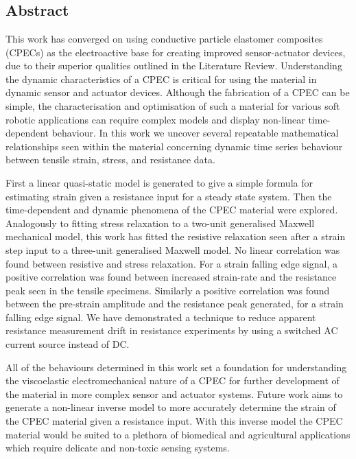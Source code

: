 \chapter{\chapiiiname}
\label{chapter3}



\section*{Abstract}
This work has converged on using conductive particle elastomer composites (CPECs) as the electroactive base for creating improved sensor-actuator devices, due to their superior qualities outlined in the Literature Review. Understanding the dynamic characteristics of a CPEC is critical for using the material in dynamic sensor and actuator devices. Although the fabrication of a CPEC can be simple, the characterisation and optimisation of such a material for various soft robotic applications can require complex models and display non-linear time-dependent behaviour. In this work we uncover several repeatable mathematical relationships seen within the material concerning dynamic time series behaviour between tensile strain, stress, and resistance data. 

First a linear quasi-static model is generated to give a simple formula for estimating strain given a resistance input for a steady state system. Then the time-dependent and dynamic phenomena of the CPEC material were explored. Analogously to fitting stress relaxation to a two-unit generalised Maxwell mechanical model, this work has fitted the resistive relaxation seen after a strain step input to a three-unit generalised Maxwell model. No linear correlation was found between resistive and stress relaxation. For a strain falling edge signal, a positive correlation was found between increased strain-rate and the resistance peak seen in the tensile specimens. Similarly a positive correlation was found between the pre-strain amplitude and the resistance peak generated, for a strain falling edge signal. We have demonstrated a technique to reduce apparent resistance measurement drift in resistance experiments by using a switched AC current source instead of DC.

All of the behaviours determined in this work set a foundation for understanding the viscoelastic electromechanical nature of a CPEC for further development of the material in more complex sensor and actuator systems. Future work aims to generate a non-linear inverse model to more accurately determine the strain of the CPEC material given a resistance input. With this inverse model the CPEC material would be suited to a plethora of biomedical and agricultural applications which require delicate and non-toxic sensing systems.




